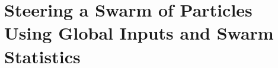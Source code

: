 \chapter[Steering a Swarm of Particles Using Global Inputs and Swarm Statistics]{Steering a Swarm of Particles\\ Using Global Inputs and Swarm Statistics}\label{chap-manipulation}




%












   
%
   
%
%
%


